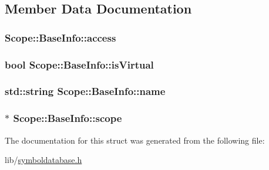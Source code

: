 \subsection{Member Data Documentation}
\hypertarget{struct_scope_1_1_base_info_a8df5353632878e299ebae3c5d8563e26}{
\subsubsection[{access}]{ Scope\-::\-Base\-Info\-::access}}\label{struct_scope_1_1_base_info_a8df5353632878e299ebae3c5d8563e26}
\hypertarget{struct_scope_1_1_base_info_acd3c79704b39f242a659afc3ba076351}{
\subsubsection[{is\-Virtual}]{\setlength{\rightskip}{0pt plus 5cm}bool Scope\-::\-Base\-Info\-::is\-Virtual}}\label{struct_scope_1_1_base_info_acd3c79704b39f242a659afc3ba076351}
\hypertarget{struct_scope_1_1_base_info_a1108c2c0472d3040a519f40e6b8dae37}{
\subsubsection[{name}]{\setlength{\rightskip}{0pt plus 5cm}std\-::string Scope\-::\-Base\-Info\-::name}}\label{struct_scope_1_1_base_info_a1108c2c0472d3040a519f40e6b8dae37}
\hypertarget{struct_scope_1_1_base_info_a1f9d93e11a4e852b4f1369b65df15ddc}{
\subsubsection[{scope}]{$\ast$ Scope\-::\-Base\-Info\-::scope}}\label{struct_scope_1_1_base_info_a1f9d93e11a4e852b4f1369b65df15ddc}


The documentation for this struct was generated from the following file\-:\begin{DoxyCompactItemize}
\item 
lib/\hyperlink{symboldatabase_8h}{symboldatabase.\-h}\end{DoxyCompactItemize}
